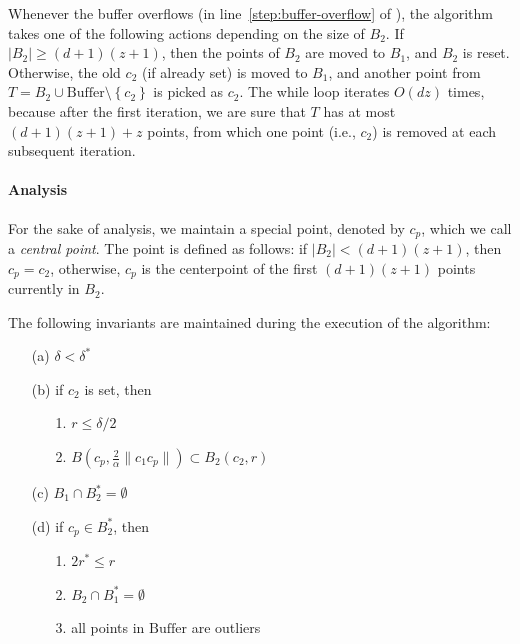 \documentclass[envcountsame]{cls/cccg15}
\newcommand{\cp}{c_p}
\newcommand{\dz}{(d + 1)(z + 1)}
\newcommand{\Buffer}{\ensuremath{\text{Buffer}}}
\newcommand{\set}[1]{\left\{ #1 \right\}}
\newcommand{\card}[1]{\left|{#1}\right|}
\newcommand{\len}[1]{\|{#1}\|}
\newcommand{\radius}[1]{\frac{2}{\alpha} \len{c_1 #1}}
\newcommand{\lee}{\leqslant}
\newcommand{\gee}{\geqslant}
\renewcommand{\leq}{\lee}
\renewcommand{\le}{\lee}
\renewcommand{\ge}{\gee}
\begin{document}
Whenever the buffer overflows (in line~\ref{step:buffer-overflow} of ),
the algorithm takes one of the following actions
depending on the size of $B_2$. 
If $|B_2| \ge \dz$, then the points of $B_2$ are moved to $B_1$, and $B_2$ is reset.
Otherwise, the old $c_2$ (if already set) is moved to $B_1$,
and another point from $T = B_2 \cup \Buffer \setminus \set{c_2}$ is picked as $c_2$.
The while loop iterates $O(dz)$ times,
because after the first iteration, we are sure 
that $T$ has at most $\dz + z$ points, from which 
one point (i.e., $c_2$) is removed at each subsequent iteration.


\paragraph{Analysis}
For the sake of analysis, we maintain a special point,
denoted by $\cp$, %
which we call a \emph{central point}.
The point is defined as follows:
if $\card{B_2} < \dz$, then $\cp = c_2$, otherwise,
$\cp$ is the centerpoint of the first $\dz$ points currently in $B_2$.

\begin{lemma}
\label{lem:invariants}
	The following invariants are maintained during the execution of the algorithm:

\begin{enumerate}
\item [(a)] $\delta < \delta^*$ %
\item [(b)] if $c_2$ is set, then
\begin{enumerate}
	\item[1.] $r \leq \delta/2$
	\item[2.] $B(c_p, \radius{c_p}) \subset B_2(c_2, r)$
\end{enumerate}
\item [(c)] $B_1 \cap B_2^* = \emptyset$
\item [(d)]  if $\cp \in B_2^*$, then 
	\begin{enumerate}
		\item [1.] $2r^* \le r$
		\item [2.] $B_2 \cap B_1^* = \emptyset$
		\item [3.] all points in $\Buffer$ are outliers
	\end{enumerate}

\end{enumerate}
\end{lemma}
\end{document}
